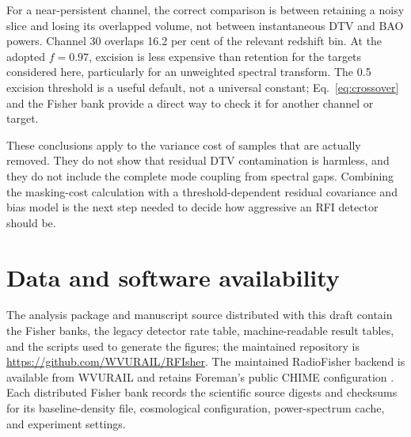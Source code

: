 For a near-persistent channel, the correct comparison is between
retaining a noisy slice and losing its overlapped volume, not between
instantaneous DTV and BAO powers. Channel 30 overlaps 16.2 per cent of
the relevant redshift bin. At the adopted $f=0.97$, excision is less
expensive than retention for the targets considered here, particularly
for an unweighted spectral transform. The 0.5 excision threshold is a
useful default, not a universal constant; Eq.~\eqref{eq:crossover} and
the Fisher bank provide a direct way to check it for another channel or
target.

These conclusions apply to the variance cost of samples that are
actually removed. They do not show that residual DTV contamination is
harmless, and they do not include the complete mode coupling from
spectral gaps. Combining the masking-cost calculation with a
threshold-dependent residual covariance and bias model is the next step
needed to decide how aggressive an RFI detector should be.

\section*{Data and software availability}

The analysis package and manuscript source distributed with this draft
contain the Fisher banks, the legacy detector rate table,
machine-readable result tables, and the scripts used to generate the
figures; the maintained repository is
\url{https://github.com/WVURAIL/RFIsher}. The maintained
RadioFisher backend is available from WVURAIL \citep{RadioFisherFork} and
retains Foreman's public CHIME configuration \citep{Foreman2021}. Each
distributed Fisher bank records the scientific source digests and checksums
for its baseline-density file, cosmological configuration, power-spectrum
cache, and experiment settings.
